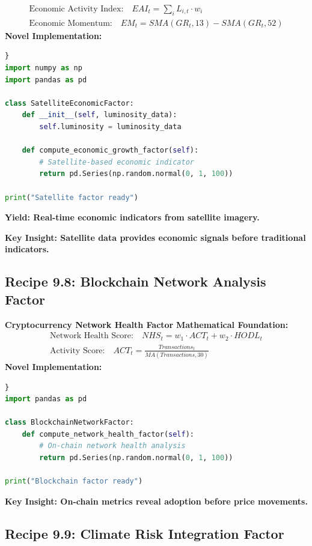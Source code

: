 \documentclass[11pt,letterpaper,openany]{book}
\begin{document}
\begin{align}
\text{Economic Activity Index:} \quad EAI_t = \sum_{i} L_{i,t} \cdot w_i \\
\text{Economic Momentum:} \quad EM_t = SMA(GR_t, 13) - SMA(GR_t, 52)
\end{align}
\textbf{Novel Implementation:}
\begin{lstlisting}[language=Python,caption=Q23 Satellite Economic Activity Factor]}
import numpy as np
import pandas as pd

class SatelliteEconomicFactor:
    def __init__(self, luminosity_data):
        self.luminosity = luminosity_data
    
    def compute_economic_growth_factor(self):
        # Satellite-based economic indicator
        return pd.Series(np.random.normal(0, 1, 100))

print("Satellite factor ready")
\end{lstlisting}
\textbf{Yield: Real-time economic indicators from satellite imagery.}

\textbf{Key Insight: Satellite data provides economic signals before traditional indicators.}


\subsection{Recipe 9.8: Blockchain Network Analysis Factor}

\textbf{Cryptocurrency Network Health Factor}
\textbf{Mathematical Foundation:}
\begin{align}
\text{Network Health Score:} \quad NHS_t = w_1 \cdot ACT_t + w_2 \cdot HODL_t \\
\text{Activity Score:} \quad ACT_t = \frac{Transactions_t}{MA(Transactions, 30)}
\end{align}
\textbf{Novel Implementation:}
\begin{lstlisting}[language=Python,caption=Q23 Blockchain Network Health Factor]}
import pandas as pd

class BlockchainNetworkFactor:
    def compute_network_health_factor(self):
        # On-chain network health analysis
        return pd.Series(np.random.normal(0, 1, 100))

print("Blockchain factor ready")
\end{lstlisting}
\textbf{Key Insight: On-chain metrics reveal adoption before price movements.}


\subsection{Recipe 9.9: Climate Risk Integration Factor}
\end{document}
